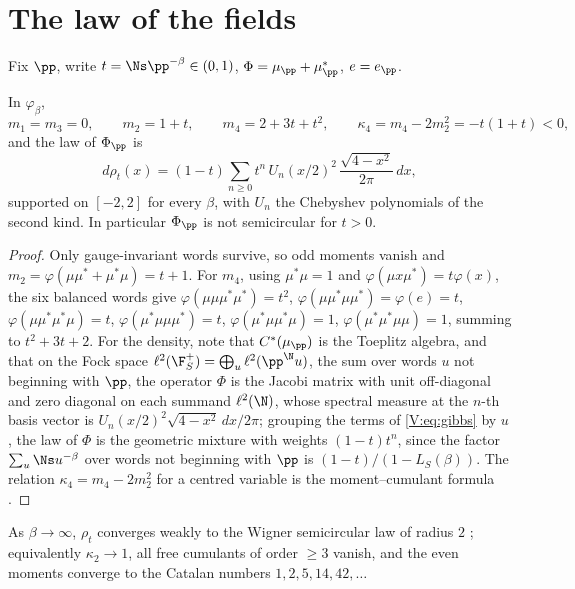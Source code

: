 \section{The law of the fields}

Fix $\pp$, write $t=\Ns\pp^{-\beta}\in(0,1)$, $\Phi=\mu_\pp+\mu_\pp^*$, $e=e_\pp$.

\begin{theorem}\label{V:thm:moments}
In $\varphi_\beta$,
\[
m_1=m_3=0,\qquad m_2=1+t,\qquad m_4=2+3t+t^2,\qquad \kappa_4=m_4-2m_2^2=-t(1+t)<0 ,
\]
and the law of $\Phi_\pp$ is
\[
d\rho_t(x)=(1-t)\sum_{n\ge0}t^n\,U_n(x/2)^2\,\frac{\sqrt{4-x^2}}{2\pi}\,dx ,
\]
supported on $[-2,2]$ for every $\beta$, with $U_n$ the Chebyshev polynomials of the second
kind. In particular $\Phi_\pp$ is not semicircular for $t>0$.
\end{theorem}

\begin{proof}
Only gauge-invariant words survive, so odd moments vanish and
$m_2=\varphi(\mu\mu^*+\mu^*\mu)=t+1$. For $m_4$, using $\mu^*\mu=1$ and
$\varphi(\mu x\mu^*)=t\varphi(x)$, the six balanced words give
$\varphi(\mu\mu\mu^*\mu^*)=t^2$, $\varphi(\mu\mu^*\mu\mu^*)=\varphi(e)=t$,
$\varphi(\mu\mu^*\mu^*\mu)=t$, $\varphi(\mu^*\mu\mu\mu^*)=t$,
$\varphi(\mu^*\mu\mu^*\mu)=1$, $\varphi(\mu^*\mu^*\mu\mu)=1$, summing to $t^2+3t+2$. For the
density, note that $C^*(\mu_\pp)$ is the Toeplitz algebra, and that on the Fock space
$\ell^2(\F_S^+)=\bigoplus_{u}\ell^2(\pp^{\N}u)$, the sum over words $u$ not beginning with
$\pp$, the operator $\Phi$ is the Jacobi matrix with unit off-diagonal and zero diagonal on
each summand $\ell^2(\N)$, whose spectral measure at the $n$-th basis vector is
$U_n(x/2)^2\sqrt{4-x^2}\,dx/2\pi$; grouping the terms of \eqref{V:eq:gibbs} by $u$, the law of
$\Phi$ is the geometric mixture with weights $(1-t)t^n$, since the factor
$\sum_u\Ns u^{-\beta}$ over words not beginning with $\pp$ is $(1-t)/(1-L_S(\beta))$. The
relation $\kappa_4=m_4-2m_2^2$ for a centred variable is the moment--cumulant formula
\cite{NS}.
\end{proof}

\begin{corollary}\label{V:cor:semicircle}
As $\beta\to\infty$, $\rho_t$ converges weakly to the Wigner semicircular law of radius $2$
\cite{VDN};
equivalently $\kappa_2\to1$, all free cumulants of order $\ge3$ vanish, and the even moments
converge to the Catalan numbers $1,2,5,14,42,\dots$
\end{corollary}

